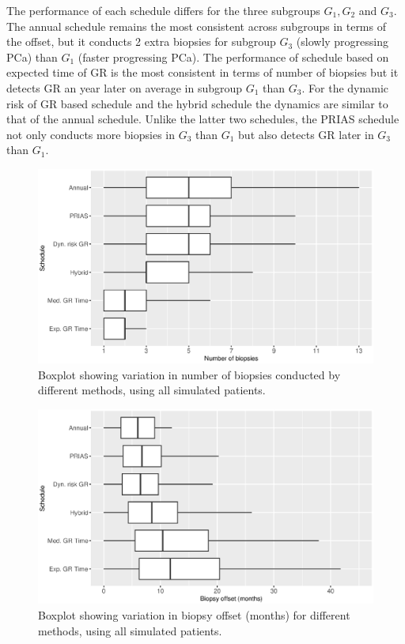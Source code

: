 The performance of each schedule differs for the three subgroups $G_1, G_2$ and $G_3$. The annual schedule remains the most consistent across subgroups in terms of the offset, but it conducts 2 extra biopsies for subgroup $G_3$ (slowly progressing PCa) than $G_1$ (faster progressing PCa). The performance of schedule based on expected time of GR is the most consistent in terms of number of biopsies but it detects GR an year later on average in subgroup $G_1$ than $G_3$. For the dynamic risk of GR based schedule and the hybrid schedule the dynamics are similar to that of the annual schedule. Unlike the latter two schedules, the PRIAS schedule not only conducts more biopsies in $G_3$ than $G_1$ but also detects GR later in $G_3$ than $G_1$.

\begin{figure}[!htb]
\centerline{\includegraphics[width=\columnwidth]{images/sim_study/nbBoxPlot_all.eps}}
\caption{Boxplot showing variation in number of biopsies conducted by different methods, using all simulated patients.}
\label{fig : nbBoxPlot_all}
\end{figure}

\begin{figure}[!htb]
\centerline{\includegraphics[width=\columnwidth]{images/sim_study/offsetBoxPlot_all.eps}}
\caption{Boxplot showing variation in biopsy offset (months) for different methods, using all simulated patients.}
\label{fig : offsetBoxPlot_all}
\end{figure}

